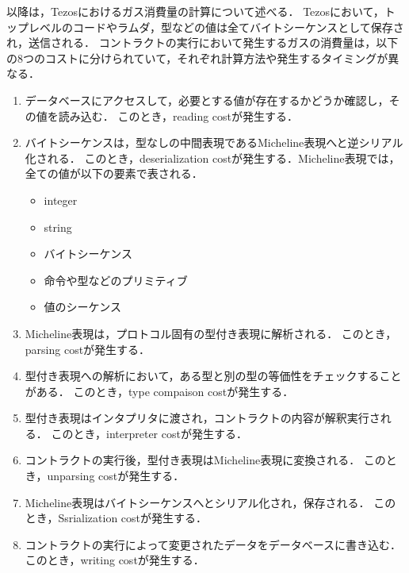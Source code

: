 \documentclass{kuisthesis}
\begin{document}
以降は，Tezosにおけるガス消費量の計算について述べる．
Tezosにおいて，トップレベルのコードやラムダ，型などの値は全てバイトシーケンスとして保存され，送信される．
コントラクトの実行において発生するガスの消費量は，以下の8つのコストに分けられていて，それぞれ計算方法や発生するタイミングが異なる．

\begin{enumerate}
  \item データベースにアクセスして，必要とする値が存在するかどうか確認し，その値を読み込む．
  このとき，reading costが発生する．
  \item バイトシーケンスは，型なしの中間表現であるMicheline表現へと逆シリアル化される．
  このとき，deserialization costが発生する．Micheline表現では，全ての値が以下の要素で表される．
  \begin{itemize}
    \item integer
    \item string
    \item バイトシーケンス
    \item 命令や型などのプリミティブ
    \item 値のシーケンス
  \end{itemize}
  \item Micheline表現は，プロトコル固有の型付き表現に解析される．
  このとき，parsing costが発生する．
  \item 型付き表現への解析において，ある型と別の型の等価性をチェックすることがある．
  このとき，type compaison costが発生する．
  \item 型付き表現はインタプリタに渡され，コントラクトの内容が解釈実行される．
  このとき，interpreter costが発生する．
  \item コントラクトの実行後，型付き表現はMicheline表現に変換される．
  このとき，unparsing costが発生する．
  \item Micheline表現はバイトシーケンスへとシリアル化され，保存される．
  このとき，Ssrialization costが発生する．
  \item コントラクトの実行によって変更されたデータをデータベースに書き込む．
  このとき，writing costが発生する．
\end{enumerate}
\end{document}
